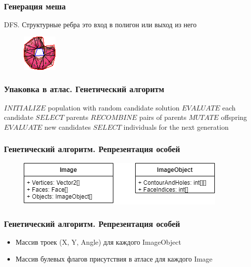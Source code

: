 \documentclass[10pt, unicode]{beamer}
\begin{document}
    \begin{frame}
        \frametitle{Генерация меша}
        DFS. Структурные ребра это вход в полигон или выход из него
        \begin{figure}[H]
            \centering
            \includegraphics[scale=1.5]{donutpixel_mesh.png}
        \end{figure}
    \end{frame}
    \begin{frame}
        \frametitle{Упаковка в атлас. Генетический алгоритм}
        \begin{center}
            \begin{algorithmic}[1]
                \State $INITIALIZE$ population with random candidate solution
                \State $EVALUATE$ each candidate
                    \State $SELECT$ parents
                    \State $RECOMBINE$ pairs of parents
                    \State $MUTATE$ offspring
                    \State $EVALUATE$ new candidates
                    \State $SELECT$ individuals for the next generation
                \EndWhile
            \end{algorithmic}
        \end{center}
    \end{frame}
    \begin{frame}
        \frametitle{Генетический алгоритм. Репрезентация особей}
        \begin{figure}[H]
            \centering
            \includegraphics[scale=0.8]{Image.png}
        \end{figure}
    \end{frame}
    \begin{frame}
        \frametitle{Генетический алгоритм. Репрезентация особей}
        \begin{itemize}
            \item Массив троек (X, Y, Angle) для каждого ImageObject
            \item Массив булевых флагов присутствия в атласе для каждого Image
        \end{itemize}
    \end{frame}
\end{document}
